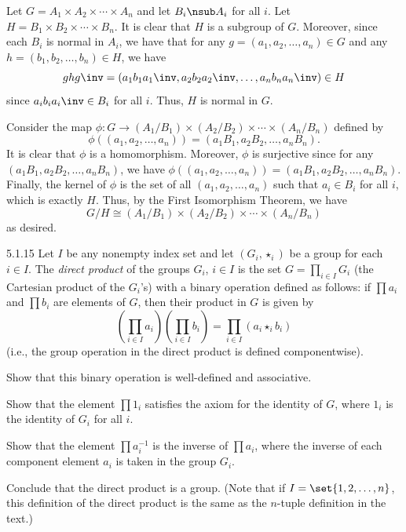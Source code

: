 \begin{sol}
    Let $G = A_1 \times A_2 \times \cdots \times A_n$ and let $B_i \nsub A_i$ for all $i$.
	Let $H = B_1 \times B_2 \times \cdots \times B_n$.
	It is clear that $H$ is a subgroup of $G$.
	Moreover, since each $B_i$ is normal in $A_i$, we have that for any $g = (a_1, a_2, \ldots, a_n) \in G$ and any $h = (b_1, b_2, \ldots, b_n) \in H$, we have
    \[
    	ghg\inv = (a_1b_1a_1\inv, a_2b_2a_2\inv, \ldots, a_nb_na_n\inv) \in H
    \]
    since $a_ib_ia_i\inv \in B_i$ for all $i$.
	Thus, $H$ is normal in $G$.

    Consider the map $\phi : G \to (A_1/B_1) \times (A_2/B_2) \times \cdots \times (A_n/B_n)$ defined by
    \[
    	\phi((a_1, a_2, \ldots, a_n)) = (a_1B_1, a_2B_2, \ldots, a_nB_n).
    \]
    It is clear that $\phi$ is a homomorphism.
	Moreover, $\phi$ is surjective since for any $(a_1B_1, a_2B_2, \ldots, a_nB_n)$, we have $\phi((a_1, a_2, \ldots, a_n)) = (a_1B_1, a_2B_2, \ldots, a_nB_n)$.
	Finally, the kernel of $\phi$ is the set of all $(a_1, a_2, \ldots, a_n)$ such that $a_i \in B_i$ for all $i$, which is exactly $H$.
	Thus, by the First Isomorphism Theorem, we have
    \[
    	G/H \cong (A_1/B_1) \times (A_2/B_2) \times \cdots \times (A_n/B_n)
    \]
    as desired.
\end{sol}

\begin{exercise}{5.1.15}
    Let $I$ be any nonempty index set and let $(G_i, \star_i)$ be a group for each $i \in I$.
	The \emph{direct product} of the groups $G_i$, $i \in I$ is the set $G = \prod_{i \in I} G_i$ (the Cartesian product of the $G_i$'s) with a binary operation defined as follows: if $\prod a_i$ and $\prod b_i$ are elements of $G$, then their product in $G$ is given by
    \[
    	\left(\prod_{i \in I} a_i\right)\left(\prod_{i \in I} b_i\right) = \prod_{i \in I} (a_i \star_i b_i)
    \]
    (i.e., the group operation in the direct product is defined componentwise).
    \begin{subexercises}
        \item Show that this binary operation is well-defined and associative.
        \item Show that the element $\prod 1_i$ satisfies the axiom for the identity of $G$, where $1_i$ is the identity of $G_i$ for all $i$.
        \item Show that the element $\prod a_i^{-1}$ is the inverse of $\prod a_i$, where the inverse of each component element $a_i$ is taken in the group $G_i$.
    \end{subexercises}
    Conclude that the direct product is a group. (Note that if $I = \set{1, 2, \ldots, n}$, this definition of the direct product is the same as the $n$-tuple definition in the text.)
\end{exercise}

